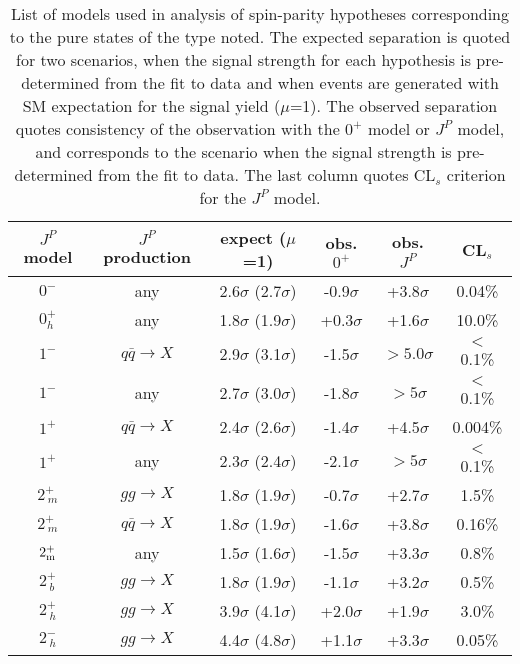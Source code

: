 \begin{table}[h]
\centering
\begin{tabular}{|c|c|c|c|c|c|} 
\hline%
 $J^P$ model & $J^P$ production & expect ($\mu$=1) &  obs. $0^+$  & obs. $J^P$ & CL$_s$  \\
\hline%
$0^-$     & any         &  2.6$\sigma$ (2.7$\sigma$)  & -0.9$\sigma$ & +3.8$\sigma$  &  0.04\%  \\
$0_h^+$  & any         &  1.8$\sigma$ (1.9$\sigma$)  & +0.3$\sigma$ &  +1.6$\sigma$  &  10.0\% \\
$1^-$     & $q \bar q\to X$         &  2.9$\sigma$ (3.1$\sigma$)  & -1.5$\sigma$ &  $>5.0\sigma$  &  $<$0.1\% \\
$1^-$   & any       &  2.7$\sigma$ (3.0$\sigma$)  & -1.8$\sigma$ &  $>5\sigma$    &  $<$0.1\% \\
 $1^+$    & $q \bar q\to X$          &  2.4$\sigma$ (2.6$\sigma$)  & -1.4$\sigma$  & +4.5$\sigma$  &  0.004\% \\
 $1^+$   & any           &  2.3$\sigma$ (2.4$\sigma$)  & -2.1$\sigma$ &  $>5\sigma$    &  $<$0.1\% \\
$2_{~m}^+$   & $gg \to X$  &  1.8$\sigma$ (1.9$\sigma$)  & -0.7$\sigma$ & +2.7$\sigma$  &  1.5\% \\
$2_{~m}^+$  & $q \bar q\to X$ &  1.8$\sigma$ (1.9$\sigma$)  & -1.6$\sigma$ & +3.8$\sigma$  &  0.16\% \\
 $2_{\rm m}^+$  & any     &  1.5$\sigma$ (1.6$\sigma$)  & -1.5$\sigma$ & +3.3$\sigma$  &  0.8\% \\
$2_{~b}^+$      & $gg \to X$     &  1.8$\sigma$ (1.9$\sigma$)  & -1.1$\sigma$ & +3.2$\sigma$  &  0.5\% \\
$2_{~h}^+$    & $gg \to X$       &  3.9$\sigma$ (4.1$\sigma$)  & +2.0$\sigma$ & +1.9$\sigma$  &  3.0\% \\
$2_{~h}^-$     & $gg \to X$      &  4.4$\sigma$ (4.8$\sigma$)  & +1.1$\sigma$ & +3.3$\sigma$  &  0.05\% \\
\hline%
\end{tabular}
\caption{ List of models used in analysis of spin-parity hypotheses
  corresponding to the pure states of the type noted.  The expected
  separation is quoted for two scenarios, when the signal strength for
  each hypothesis is pre-determined from the fit to data and when
  events are generated with SM expectation for the signal yield
  ($\mu$=1).  The observed separation quotes consistency of the
  observation with the $0^+$ model or $J^P$ model, and corresponds to
  the scenario when the signal strength is pre-determined from the fit
  to data.  The last column quotes CL$_s$ criterion for the $J^P$
  model.  }
\label{table:HZZ4lhypothTests}
\end{table}


